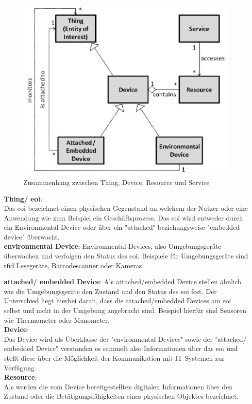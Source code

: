 \documentclass[a4paper, 12pt, twoside, headsepline=true]{scrartcl} %
\begin{document}
\begin{figure}[H]
	\includegraphics[height=8 cm,keepaspectratio,center]{figures/domainmodel}
	\caption{Zusammenhang zwischen Thing, Device, Resource und Service \cite{haller2010things}}
	\label{domainmodel}
\end{figure}

\textbf{Thing/ \ac{eoi}}: \\ 
Das \ac{eoi} bezeichnet einen physischen Gegenstand an welchem der Nutzer oder eine Anwendung wie zum Beispiel ein Geschäftsprozess. Das \ac{eoi} wird entweder durch ein Environmental Device oder über ein "attached" beziehungsweise "embedded device" überwacht.
\\

\textbf{environmental Device}: 
Environmental Devices, also Umgebungsgeräte überwachen und verfolgen den Status des \ac{eoi}. Beispiele für Umgebungsgeräte sind \ac{rfid} Lesegeräte, Barcodescanner oder Kameras

\textbf{attached/ embedded Device}: 
Als attached/embedded Device stellen ähnlich wie die Umgebungsgeräte den Zustand und den Status des \ac{eoi} fest. Der Unterschied liegt hierbei daran, dass die attached/embedded Devices am \ac{eoi} selbst und nicht in der Umgebung angebracht sind. Beispiel hierfür sind Sensoren wie Thermometer oder Manometer.
\\

\textbf{Device}: \\
Das Device wird als Überklasse der "environmental Devices" sowie der "attached/ embedded Device" verstanden es sammelt also Informationen über das \ac{eoi} und stellt diese über die Möglichkeit der Kommunikation mit IT-Systemen zur Verfügung.
\\

\textbf{Resource}: \\
Als werden die vom Device bereitgestellten digitalen Informationen über den Zustand oder die Betätigungsfähigkeiten eines physischen Objektes bezeichnet.
\\
\end{document}
